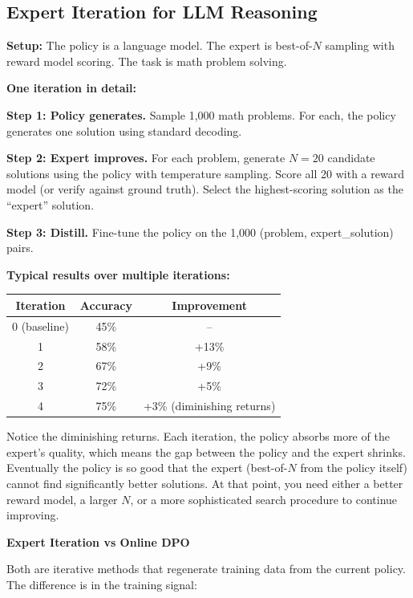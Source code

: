 \begin{chapterenv}
\subsection{Expert Iteration for LLM Reasoning}

\textbf{Setup:} The policy is a language model. The expert is best-of-$N$ sampling with reward model scoring. The task is math problem solving.

\textbf{One iteration in detail:}

\textbf{Step 1: Policy generates.} Sample 1,000 math problems. For each, the policy generates one solution using standard decoding.

\textbf{Step 2: Expert improves.} For each problem, generate $N = 20$ candidate solutions using the policy with temperature sampling. Score all 20 with a reward model (or verify against ground truth). Select the highest-scoring solution as the ``expert'' solution.

\textbf{Step 3: Distill.} Fine-tune the policy on the 1,000 (problem, expert\_solution) pairs.

\textbf{Typical results over multiple iterations:}

\begin{center}
\begin{tabular}{ccc}
\toprule
\textbf{Iteration} & \textbf{Accuracy} & \textbf{Improvement} \\
\midrule
0 (baseline) & 45\% & -- \\
1 & 58\% & +13\% \\
2 & 67\% & +9\% \\
3 & 72\% & +5\% \\
4 & 75\% & +3\% (diminishing returns) \\
\bottomrule
\end{tabular}
\end{center}

Notice the diminishing returns. Each iteration, the policy absorbs more of the expert's quality, which means the gap between the policy and the expert shrinks. Eventually the policy is so good that the expert (best-of-$N$ from the policy itself) cannot find significantly better solutions. At that point, you need either a better reward model, a larger $N$, or a more sophisticated search procedure to continue improving.

\begin{tipbox}
\textbf{Expert Iteration vs Online DPO}

Both are iterative methods that regenerate training data from the current policy. The difference is in the training signal:


\end{tipbox}
\end{chapterenv}
